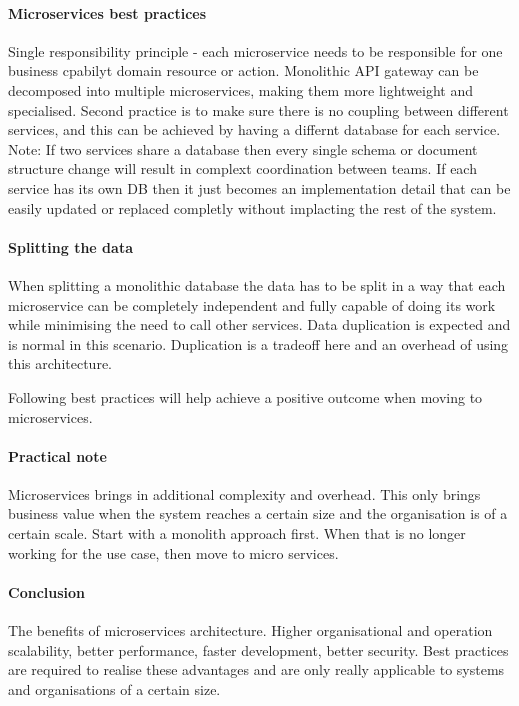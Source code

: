 \documentclass[a4paper, 11pt]{book}
\begin{document}
    \paragraph{Microservices best practices}
    Single responsibility principle - each microservice needs to be responsible for one business cpabilyt domain resource or action.
    Monolithic API gateway can be decomposed into multiple microservices, making them more lightweight and specialised.
    Second practice is to make sure there is no coupling between different services, and this can be achieved by having a differnt database for each service.
    Note: If two services share a database then every single schema or document structure change will result in complext coordination between teams.
    If each service has its own DB then it just becomes an implementation detail that can be easily updated or replaced completly without implacting the rest of the system.

    \paragraph{Splitting the data}
    When splitting a monolithic database the data has to be split in a way that each microservice can be completely independent and fully capable of doing its work while minimising the need to call other services.
    Data duplication is expected and is normal in this scenario.
    Duplication is a tradeoff here and an overhead of using this architecture.

    Following best practices will help achieve a positive outcome when moving to microservices.

    \paragraph{Practical note}
    Microservices brings in additional complexity and overhead.
    This only brings business value when the system reaches a certain size and the organisation is of a certain scale.
    Start with a monolith approach first.
    When that is no longer working for the use case, then move to micro services.

    \paragraph{Conclusion}

    The benefits of microservices architecture.
    Higher organisational and operation scalability, better performance, faster development, better security.
    Best practices are required to realise these advantages and are only really applicable to systems and organisations of a certain size.
\end{document}
